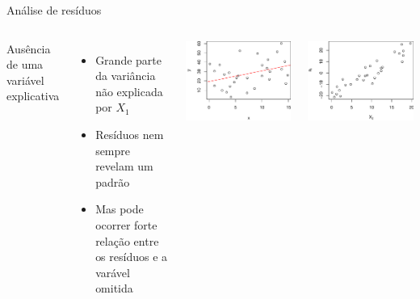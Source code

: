 \documentclass{beamer}\usepackage[]{graphicx}\usepackage[]{color}
\newenvironment{knitrout}{}{} %
\renewenvironment{knitrout}{\setlength{\topsep}{0mm}}{}
\begin{document}

\begin{frame}{Análise de resíduos}

\begin{columns}[c]

\small


Ausência de uma variável explicativa

\bigskip
\begin{itemize}
\item Grande parte da variância não explicada por $X_1$ 
\item Resíduos nem sempre revelam um padrão
\item Mas pode ocorrer forte relação entre os resíduos e a varável omitida
\end{itemize}


\begin{knitrout}
\color{fgcolor}
\includegraphics[width=1\linewidth]{figure/r14-1} 

\includegraphics[width=1\linewidth]{figure/r14-2} 


\end{knitrout}
\end{columns}
\end{frame}
\end{document}
